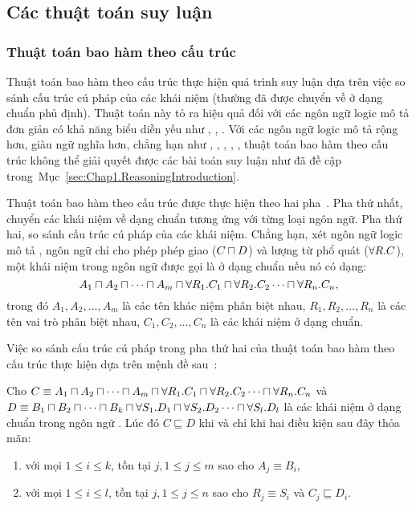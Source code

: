 \subsection{Các thuật toán suy luận}
\label{sec:Chap1.Algorithm}

\subsubsection{Thuật toán bao hàm theo cấu trúc}
\label{sec:Chap1.StructuralSubsumption}
Thuật toán bao hàm theo cấu trúc thực hiện quá trình suy luận dựa trên việc so sánh cấu trúc cú pháp của các khái niệm (thường đã được chuyển về ở dạng chuẩn phủ định). Thuật toán này tỏ ra hiệu quả đối với các ngôn ngữ logic mô tả đơn giản có khả năng biểu diễn yếu như \FLzero, \FLbot, \ALN. Với các ngôn ngữ logic mô tả rộng hơn, giàu ngữ nghĩa hơn, chẳng hạn như \ALC, \ALCI, \ALCIQ, \SHIQ, \SHOIQ, thuật toán bao hàm theo cấu trúc không thể giải quyết được các bài toán suy luận như đã đề cập trong~Mục~\ref{sec:Chap1.ReasoningIntroduction}.

Thuật toán bao hàm theo cấu trúc được thực hiện theo hai pha~\cite{DLHandbook2007}. Pha thứ nhất, chuyển các khái niệm về dạng chuẩn tương ứng với từng loại ngôn ngữ. Pha thứ hai, so sánh cấu trúc cú pháp của các khái niệm. Chẳng hạn, xét ngôn ngữ logic mô tả \FLzero, ngôn ngữ chỉ cho phép phép giao ($C \sqcap D$) và lượng từ phổ quát ($\forall R.C$), một khái niệm trong ngôn ngữ \FLzero được gọi là ở dạng chuẩn nếu nó có dạng:
$$A_1 \sqcap A_2 \sqcap \cdots \sqcap A_m \sqcap \forall R_1.C_1 \sqcap \forall R_2.C_2 \cdots \sqcap \forall R_n.C_n,$$
trong đó $A_1, A_2, \ldots, A_m$ là các tên khác niệm phân biệt nhau, $R_1, R_2, \ldots, R_n$ là các tên vai trò phân biệt nhau, $C_1, C_2, \ldots, C_n$ là các khái niệm ở dạng chuẩn.

Việc so sánh cấu trúc cú pháp trong pha thứ hai của thuật toán bao hàm theo cấu trúc thực hiện dựa trên mệnh đề sau~\cite{DLHandbook2007}:

\begin{Proposition}
	Cho $C \equiv A_1 \sqcap A_2 \sqcap \cdots \sqcap A_m \sqcap \forall R_1.C_1 \sqcap \forall R_2.C_2 \cdots \sqcap \forall R_n.C_n$ và $D \equiv B_1 \sqcap B_2 \sqcap \cdots \sqcap B_k \sqcap \forall S_1.D_1 \sqcap \forall S_2.D_2 \cdots \sqcap \forall S_l.D_l$ là các khái niệm ở dạng chuẩn trong ngôn ngữ \FLzero. Lúc đó $C \sqsubseteq D$ khi và chỉ khi hai điều kiện sau đây thỏa mãn:
	\begin{enumerate}
		\item với mọi $1 \leq i \leq k$, tồn tại $j, 1 \leq j \leq m$ sao cho $A_j \equiv B_i$,
		\item với mọi $1 \leq i \leq l$, tồn tại $j, 1 \leq j \leq n$ sao cho $R_j \equiv S_i$ và $C_j \sqsubseteq D_i$.\myend
	\end{enumerate}	
\end{Proposition}

